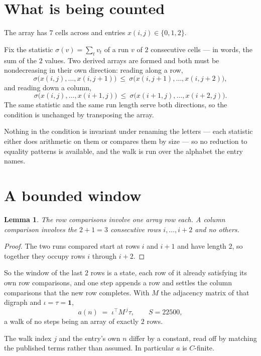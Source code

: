 \documentclass[11pt,a4paper]{article}
\theoremstyle{plain}
\newtheorem{lemma}[theorem]{Lemma}
\theoremstyle{definition}
\begin{document}
\section{What is being counted}

The array has $7$ cells across and entries $x(i,j)\in\{0,1,2\}$.

Fix the statistic $\sigma(v)=\sum_{t} v_t$ of a run $v$ of $2$ consecutive cells --- in words,
the sum of the $2$ values. Two derived arrays are formed and both must be
nondecreasing in their own direction: reading along a row,
\[
\sigma\bigl(x(i,j),\dots,x(i,j{+}1)\bigr)\ \le\
\sigma\bigl(x(i,j{+}1),\dots,x(i,j{+}2)\bigr),
\]
and reading down a column,
\[
\sigma\bigl(x(i,j),\dots,x(i{+}1,j)\bigr)\ \le\
\sigma\bigl(x(i{+}1,j),\dots,x(i{+}2,j)\bigr).
\]
The same statistic and the same run length serve both directions, so the condition is
unchanged by transposing the array.

Nothing in the condition is invariant under renaming the letters --- each statistic either does
arithmetic on them or compares them by size --- so no reduction to equality patterns is
available, and the walk is run over the alphabet the entry names.

\section{A bounded window}

\begin{lemma}\label{lem:win}
The row comparisons involve one array row each. A column comparison involves the
$2+1=3$ consecutive rows $i,\dots,i{+}2$ and no others.
\end{lemma}

\begin{proof}
The two runs compared start at rows $i$ and $i+1$ and have length $2$, so together they
occupy rows $i$ through $i+2$.
\end{proof}

So the window of the last $2$ rows is a state, each row of it already satisfying its own row
comparisons, and one step appends a row and settles the column comparisons that the new row
completes. With $M$ the adjacency matrix of that digraph and $\iota=\tau=\mathbf{1}$,
\[
a(n)\;=\;\iota^{\!\top}M^{\,j}\tau ,\qquad S=22500,
\]
a walk of no steps being an array of exactly $2$ rows.

The walk index $j$ and the entry's own $n$ differ by a constant, read off by matching the
published terms rather than assumed. In particular $a$ is $C$-finite.
\end{document}

